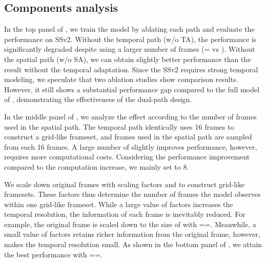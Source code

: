     \subsection{Components analysis}\label{sec:ablation}\vspace{-5pt}
    
    In the top panel of , we train the model by ablating each path and evaluate the performance on SSv2.
    Without the temporal path (\method w/o TA), the performance is significantly degraded despite using a larger number of frames (= vs ).
    Without the spatial path (\method w/o SA), we can obtain slightly better performance than the result without the temporal adaptation.
    Since the SSv2 requires strong temporal modeling, we speculate that two ablation studies show comparison results.
    However, it still shows a substantial performance gap compared to the full model of \method, demonstrating the effectiveness of the dual-path design.
    
    
    In the middle panel of , we analyze the effect according to the number of frames used in the spatial path.
    The temporal path identically uses 16 frames to construct a grid-like frameset, and frames used in the spatial path are sampled from such 16 frames.
    A large number of  slightly improves performance, however, requires more computational costs.
    Considering the performance improvement compared to the computation increase, we mainly set  to 8.

    We scale down original frames with scaling factors  and  to construct grid-like framesets.
    These factors thus determine the number of frames the model observes within one grid-like frameset.
    While a large value of factors increases the temporal resolution, the information of each frame is inevitably reduced.
    For example, the original frame is scaled down to the size of  with ==.
    Meanwhile, a small value of factors retains richer information from the original frame, however, makes the temporal resolution small.
    As shown in the bottom panel of , we attain the best performance with ==.    
        
